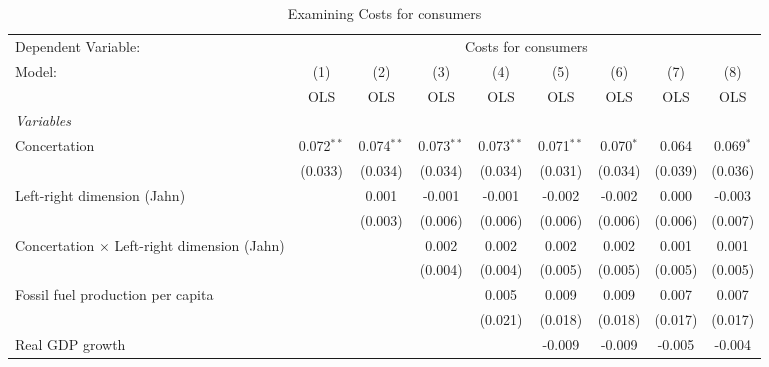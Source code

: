 
\begin{table}[htbp]
   \caption{Examining Costs for consumers}
   \centering
   \begin{tabular}{lcccccccc}
      \toprule
      Dependent Variable: & \multicolumn{8}{c}{Costs for consumers}\\
      Model:                                             & (1)          & (2)          & (3)          & (4)          & (5)          & (6)         & (7)     & (8)\\  
                                                         &  OLS         & OLS          & OLS          & OLS          & OLS          & OLS         & OLS     & OLS\\  
      \midrule
      \emph{Variables}\\
      Concertation                                       & 0.072$^{**}$ & 0.074$^{**}$ & 0.073$^{**}$ & 0.073$^{**}$ & 0.071$^{**}$ & 0.070$^{*}$ & 0.064   & 0.069$^{*}$\\   
                                                         & (0.033)      & (0.034)      & (0.034)      & (0.034)      & (0.031)      & (0.034)     & (0.039) & (0.036)\\   
      Left-right dimension (Jahn)                        &              & 0.001        & -0.001       & -0.001       & -0.002       & -0.002      & 0.000   & -0.003\\   
                                                         &              & (0.003)      & (0.006)      & (0.006)      & (0.006)      & (0.006)     & (0.006) & (0.007)\\   
      Concertation $\times$ Left-right dimension (Jahn)  &              &              & 0.002        & 0.002        & 0.002        & 0.002       & 0.001   & 0.001\\   
                                                         &              &              & (0.004)      & (0.004)      & (0.005)      & (0.005)     & (0.005) & (0.005)\\   
      Fossil fuel production per capita                  &              &              &              & 0.005        & 0.009        & 0.009       & 0.007   & 0.007\\   
                                                         &              &              &              & (0.021)      & (0.018)      & (0.018)     & (0.017) & (0.017)\\   
      Real GDP growth                                    &              &              &              &              & -0.009       & -0.009      & -0.005  & -0.004\\   

\end{tabular}
\end{table}
